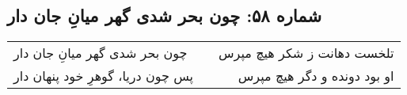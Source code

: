 \begin{center}
\section*{شماره ۵۸: چون بحر شدی گهر میانِ جان دار}
\label{sec:058}
\begin{longtable}{l p{0.5cm} r}
چون بحر شدی گهر میانِ جان دار
&&
تلخست دهانت ز شکر هیچ مپرس
\\
پس چون دریا، گوهرِ خود پنهان دار
&&
او بود دونده و دگر هیچ مپرس
\\
\end{longtable}
\end{center}
